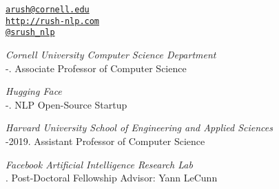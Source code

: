 \documentclass[10pt]{article}
\makeatletter
\def\myemail{arush@cornell.edu}
\def\myweb{http://rush-nlp.com}
\def\myphone{(215) 317-8089}
\def\myfax{srush\_nlp}
\makeatother
\begin{document}
\begin{minipage}[t]{2.95in}

\end{minipage}
\hfill
\hfill
\begin{minipage}[t]{1.7in}
  \flushright %
  {\scriptsize  \texttt{\href{mailto:\myemail}{\myemail}}} \\
  {\scriptsize  \texttt{\href{\myweb}{\myweb}}} \\
  {\scriptsize  \texttt{\href{http://twitter.com/\myfax}{@\myfax}}} \\
\end{minipage}


\medskip

\reversemarginpar
\medskip


\noindent\emph{Cornell University Computer Science Department \vspace{0.01in}}\\
-.  Associate Professor of Computer Science

\medskip
\noindent\emph{Hugging Face \vspace{0.01in}}\\
-.  NLP Open-Source Startup

\medskip
\noindent\emph{Harvard University School of Engineering and Applied Sciences \vspace{0.01in}}\\
-2019.  Assistant Professor of Computer Science

\medskip
\noindent\emph{Facebook Artificial Intelligence Research Lab \vspace{0.01in}}\\
.  Post-Doctoral Fellowship Advisor: Yann LeCunn

\bigskip

\end{document}
